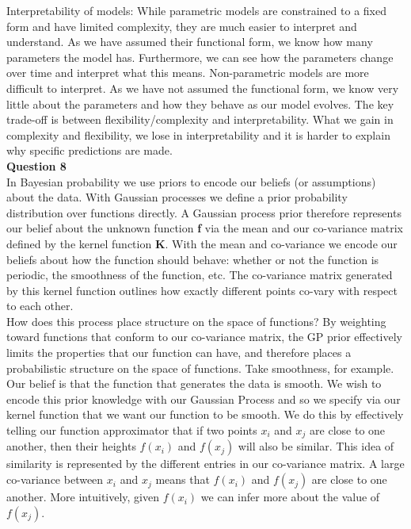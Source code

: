\documentclass[10pt, a4paper, twocolumn]{article} %
\begin{document}
\begin{enumerate}
  Interpretability of models:
  While parametric models are constrained to a fixed form and have limited complexity, they are much easier to interpret and understand. As we have assumed their functional form, we know how many parameters the model has. Furthermore, we can see how the parameters change over time and interpret what this means. Non-parametric models are more difficult to interpret. As we have not assumed the functional form, we know very little about the parameters and how they behave as our model evolves. The key trade-off is between flexibility/complexity and interpretability. What we gain in complexity and flexibility, we lose in interpretability and it is harder to explain why specific predictions are made.\\
  
  \textbf{Question 8}\\
  In Bayesian probability we use priors to encode our beliefs (or assumptions) about the data. With Gaussian processes we define a prior probability distribution over functions directly. A Gaussian process prior therefore represents our belief about the unknown function \textbf{f} via the mean and our co-variance matrix defined by the kernel function \textbf{K}. With the mean and co-variance we encode our beliefs about how the function should behave: whether or not the function is periodic, the smoothness of the function, etc. The co-variance matrix generated by this kernel function outlines how exactly different points co-vary with respect to each other.\\
  
  How does this process place structure on the space of functions? By weighting toward functions that conform to our co-variance matrix, the GP prior effectively limits the properties that our function can have, and therefore places a probabilistic structure on the space of functions. Take smoothness, for example. Our belief is that the function that generates the data is smooth. We wish to encode this prior knowledge with our Gaussian Process and so we specify via our kernel function that we want our function to be smooth. We do this by effectively telling our function approximator that if two points $x_i$ and $x_j$ are close to one another, then their heights $f(x_i)$ and $f(x_j)$ will also be similar. This idea of similarity is represented by the different entries in our co-variance matrix. A large co-variance between $x_i$ and $x_j$ means that $f(x_i)$ and $f(x_j)$ are close to one another. More intuitively, given $f(x_i)$ we can infer more about the value of $f(x_j)$.\\
  

\end{enumerate}
\end{document}
